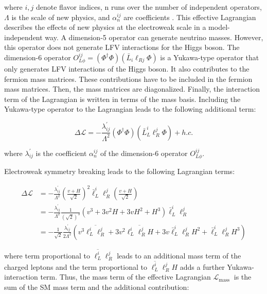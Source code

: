 where $i, j$ denote flavor indices, n runs over the number of independent operators, $\Lambda$ is the scale of new physics, and $\alpha_{n}^{i j}$ are coefficients \cite{DiazCruz:1999xe}. This effective Lagrangian describes the effects of new physics at the electroweak scale in a model-independent way. A dimension-5 operator can generate neutrino masses. However, this operator does not generate LFV interactions for the Higgs boson. The dimension-6 operator $O_{L \phi}^{i j}=(\Phi^{\dagger} \Phi)(\bar{L}_{i} \ell_{R j} \Phi)$ is a Yukawa-type operator that only generates LFV interactions of the Higgs boson. It also contributes to the fermion mass matrices. These contributions have to be included in the fermion mass matrices. Then, the mass matrices are diagonalized. Finally, the interaction term of the Lagrangian is written in terms of the mass basis. Including the Yukawa-type operator to the Lagrangian leads to the following additional term:

\begin{equation}
  \Delta \mathcal{L}=-\frac{\lambda_{i j}^{\prime}}{\Lambda^2}(\Phi^{\dagger} \Phi)(\bar{L}_{L}^{i} \ell_{R}^{j} \Phi)+h . c .
\end{equation}

where $\lambda_{i j}^{\prime}$ is the coefficient $\alpha_{n}^{i j}$ of the dimension-6 operator $O_{L \phi}^{i j}$.

Electroweak symmetry breaking leads to the following Lagrangian terms:

\begin{equation}
  \begin{aligned}
    \Delta \mathcal{L} &=-\frac{\lambda_{i j}^{\prime}}{\Lambda^2}(\frac{v+H}{\sqrt{2}})^2 \bar{\ell}_{L}^{i} \ell_{R}^{j}(\frac{v+H}{\sqrt{2}}) \\
    &=-\frac{\lambda_{i j}^{\prime}}{\Lambda^2} \frac{1}{(\sqrt{2})^{3}}(v^{3}+3 v^2 H+3 v H^2+H^{3}) \bar{\ell}_{L}^{i} \ell_{R}^{j} \\
    &=-\frac{1}{\sqrt{2}} \frac{\lambda_{i j}^{\prime}}{2 \Lambda^2}(v^{3} \overline{\ell_{L}^{i} \ell_{R}^{j}}+3 v^2 \overline{\ell_{L}^{i} \ell_{R}^{j} H}+3 v \bar{\ell}_{L}^{i} \ell_{R}^{j} H^2+\bar{\ell}_{L}^{i} \ell_{R}^{j} H^{3})
  \end{aligned}
\end{equation}

where term proportional to $\overline{\ell_{L}^{i}} \ell_{R}^{j}$ leads to an additional mass term of the charged leptons and the term proportional to $\overline{\ell_{L}^{i}} \ell_{R}^{j}H$ adds a further Yukawa-interaction term. Thus, the mass term of the effective Lagrangian $\mathcal{L}_{\text {mass }}$ is the sum of the SM mass term and the additional contribution:

